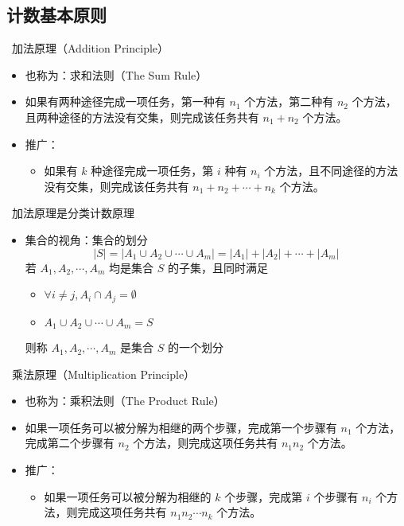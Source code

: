 \documentclass[UTF8]{report}
\theoremstyle{MyLineTheoremStyle} %
\theoremstyle{MyBlockTheoremStyle} %
\theoremstyle{MySubsubsectionStyle} %
\begin{document}
\subsection{计数基本原则}
\textbullet\ 加法原理（Addition Principle）
\begin{itemize}
    \item 也称为：求和法则（The Sum Rule）
    \item 如果有两种途径完成一项任务，第一种有 $n_1$ 个方法，第二种有 $n_2$ 个方法，且两种途径的方法没有交集，则完成该任务共有 $n_1 + n_2$ 个方法。
    \item 推广：
    \begin{itemize}
        \item 如果有 $k$ 种途径完成一项任务，第 $i$ 种有 $n_i$ 个方法，且不同途径的方法没有交集，则完成该任务共有 $n_1 + n_2 + \cdots + n_k$ 个方法。
    \end{itemize}
\end{itemize}

\textbullet\ 加法原理是分类计数原理
\begin{itemize}
    \item 集合的视角：集合的划分
    \[
    |S| = |A_1 \cup A_2 \cup \cdots \cup A_m| = |A_1| + |A_2| + \cdots + |A_m|
    \]
    若 $A_1, A_2, \cdots , A_m$ 均是集合 $S$ 的子集，且同时满足
    \begin{itemize}
        \item $\forall i \neq j, A_i \cap A_j = \emptyset$
        \item $A_1 \cup A_2 \cup \cdots \cup A_m = S$
    \end{itemize}
    则称 $A_1, A_2, \cdots , A_m$ 是集合 $S$ 的一个划分
\end{itemize}

\textbullet\ 乘法原理（Multiplication Principle）
\begin{itemize}
    \item 也称为：乘积法则（The Product Rule）
    \item 如果一项任务可以被分解为相继的两个步骤，完成第一个步骤有 $n_1$ 个方法，完成第二个步骤有 $n_2$ 个方法，则完成这项任务共有 $n_1n_2$ 个方法。
    \item 推广：
    \begin{itemize}
        \item 如果一项任务可以被分解为相继的 $k$ 个步骤，完成第 $i$ 个步骤有 $n_i$ 个方法，则完成这项任务共有 $n_1n_2 \cdots n_k$ 个方法。
    \end{itemize}
\end{itemize}
\end{document}

